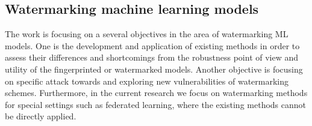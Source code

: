 \documentclass[conference]{IEEEtran}
\begin{document}
\subsection{Watermarking machine learning models}
The work is focusing on a several objectives in the area of watermarking ML models. 
One is the development and application of existing methods in order to assess their differences and shortcomings from the robustness point of view and utility of the fingerprinted or watermarked models. Another objective is focusing on specific attack towards and exploring new vulnerabilities of watermarking schemes. 
Furthermore, in the current research we focus on watermarking methods for special settings such as federated learning, where the existing methods cannot be directly applied. 



\end{document}
